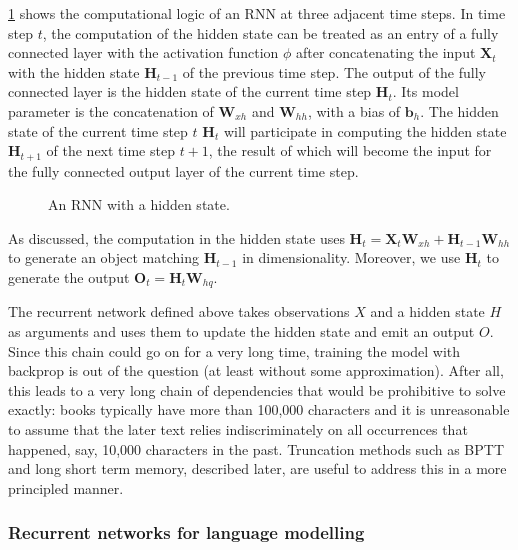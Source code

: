 \cref{fig:rnn} shows the computational logic of an RNN at three adjacent time steps. In time step $t$, the computation of the hidden state can be treated as an entry of a fully connected layer with the activation function $\phi$ after concatenating the input $\mathbf{X}_t$ with the hidden state $\mathbf{H}_{t-1}$ of the previous time step.  The output of the fully connected layer is the hidden state of the current time step $\mathbf{H}_t$. Its model parameter is the concatenation of $\mathbf{W}_{xh}$ and $\mathbf{W}_{hh}$, with a bias of $\mathbf{b}_h$. The hidden state of the current time step $t$ $\mathbf{H}_t$ will participate in computing the hidden state $\mathbf{H}_{t+1}$ of the next time step $t+1$, the result of which will become the input for the fully connected output layer of the current time step.

\begin{figure}[hpt]
	\centering
	
	\caption{An RNN with a hidden state.}
	\label{fig:rnn}
\end{figure}

As discussed, the computation in the hidden state uses $\mathbf{H}_t = \mathbf{X}_t \mathbf{W}_{xh} + \mathbf{H}_{t-1} \mathbf{W}_{hh}$ to generate an object matching $\mathbf{H}_{t-1}$ in dimensionality. Moreover, we use $\mathbf{H}_t$ to generate the output $\mathbf{O}_t = \mathbf{H}_t \mathbf{W}_{hq}$.

The recurrent network defined above takes observations $X$ and a hidden state $H$ as arguments and uses them to update the hidden state and emit an output $O$. Since this chain could go on for a very long time, training the model with backprop is out of the question (at least without some approximation). After all, this leads to a very long chain of dependencies that would be prohibitive to solve exactly: books typically have more than 100,000 characters and it is unreasonable to assume that the later text relies indiscriminately on all occurrences that happened, say, 10,000 characters in the past. Truncation methods such as BPTT and long short term memory, described later, are useful to address this in a more principled manner. 

\subsubsection{Recurrent networks for language modelling}\label{subsubsec:rnn_lang_modelling}

